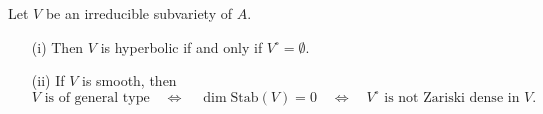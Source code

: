 \begin{theorem} Let $V$ be an irreducible subvariety of $A$. 
  \begin{enumerate}
  \item [(i)]  Then $V$ is hyperbolic if and only if
    $V^{\circ}=\emptyset$. 
  \item[(ii)] If $V$ is smooth, then
    \begin{equation*}
      V \text{ is of general type}\quad\Leftrightarrow \quad\dim
      \mathrm{Stab}(V)=0 \quad\Leftrightarrow\quad
      \text{$V^{\circ}$ is
        not Zariski dense in $V$.}
    \end{equation*}
  \end{enumerate}
\end{theorem}

